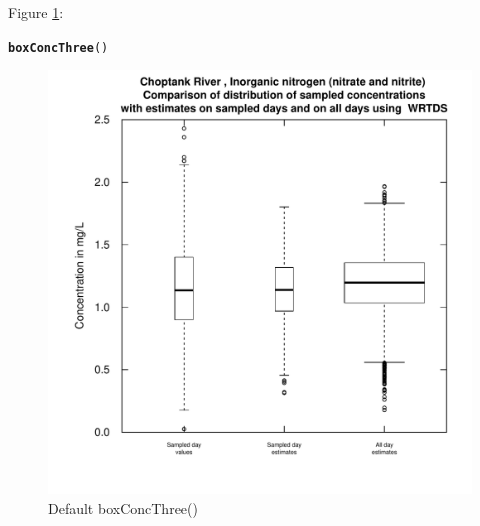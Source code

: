 \documentclass[a4paper,11pt]{article}\usepackage{graphicx, color}
\makeatletter
\newcommand{\hlfunctioncall}[1]{\textcolor[rgb]{0.501960784313725,0,0.329411764705882}{\textbf{#1}}}%
\newenvironment{kframe}{%
 \def\at@end@of@kframe{}%
 \ifinner\ifhmode%
  \def\at@end@of@kframe{\end{minipage}}%
  \begin{minipage}{\columnwidth}%
 \fi\fi%
 \def\FrameCommand##1{\hskip\@totalleftmargin \hskip-\fboxsep
 \colorbox{shadecolor}{##1}\hskip-\fboxsep
     \hskip-\linewidth \hskip-\@totalleftmargin \hskip\columnwidth}%
 \MakeFramed {\advance\hsize-\width
   \@totalleftmargin\z@ \linewidth\hsize
   \@setminipage}}%
 {\par\unskip\endMakeFramed%
 \at@end@of@kframe}
\newenvironment{knitrout}{}{} %
\makeatother
\begin{document}
Figure \ref{fig:boxConcThree}:
\begin{knitrout}
\color{fgcolor}\begin{kframe}
\begin{alltt}
\hlfunctioncall{boxConcThree}()
\end{alltt}
\end{kframe}\begin{figure}[]

\includegraphics[width=.5\linewidth,height=.5\linewidth]{figure/boxConcThree} \caption[Default boxConcThree()]{Default boxConcThree()\label{fig:boxConcThree}}
\end{figure}


\end{knitrout}
\end{document}
